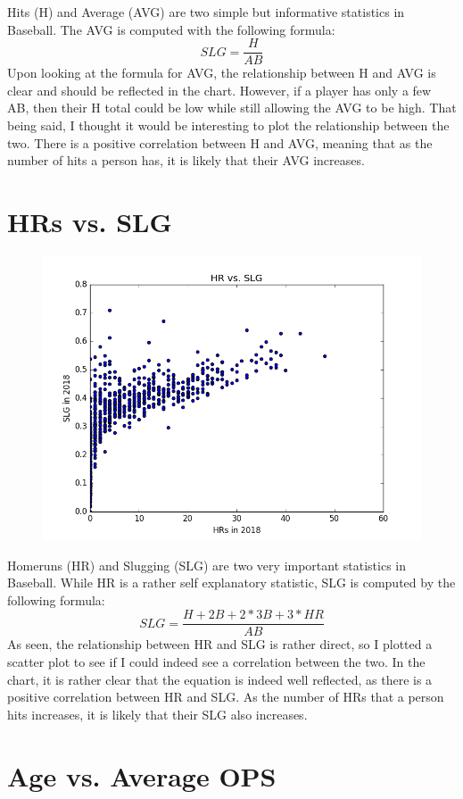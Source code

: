 \documentclass{acmart}
\begin{document}
Hits (H) and Average (AVG) are two simple but informative statistics in Baseball. The AVG is computed with the following formula: 
$$
SLG = \frac{H}{AB}
$$
Upon looking at the formula for AVG, the relationship between H and AVG is clear and should be reflected in the chart. However, if a player has only a few AB, then their H total could be low while still allowing the AVG to be high. That being said, I thought it would be interesting to plot the relationship between the two. There is a positive correlation between H and AVG, meaning that as the number of hits a person has, it is likely that their AVG increases.

\section*{HRs vs. SLG}
\begin{figure}[H]
\includegraphics[scale=.5]{HRvsSLG.png}
\end{figure}
Homeruns (HR) and Slugging (SLG) are two very important statistics in Baseball. While HR is a rather self explanatory statistic, SLG is computed by the following formula:
$$
SLG = \frac{H + 2B + 2 * 3B + 3 * HR}{AB}
$$
As seen, the relationship between HR and SLG is rather direct, so I plotted a scatter plot to see if I could indeed see a correlation between the two. In the chart, it is rather clear that the equation is indeed well reflected, as there is a positive correlation between HR and SLG. As the number of HRs that a person hits increases, it is likely that their SLG also increases.

\section*{Age vs. Average OPS}
\end{document}
